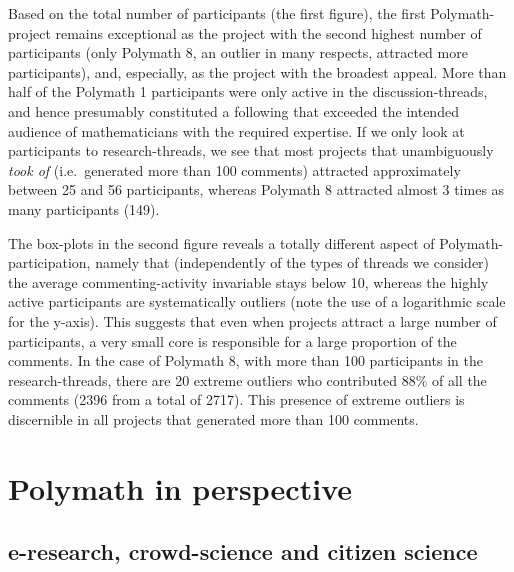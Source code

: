 \documentclass[article, floatfix, groupaddress, prb]{revtex4-1}
\begin{document}
    \begin{figure}
        \begin{center}\end{center}
        \caption{}
        \label{}
    \end{figure}
    
    Based on the total number of participants (the first figure), the first
Polymath-project remains exceptional as the project with the second
highest number of participants (only Polymath 8, an outlier in many
respects, attracted more participants), and, especially, as the project
with the broadest appeal. More than half of the Polymath 1 participants
were only active in the discussion-threads, and hence presumably
constituted a following that exceeded the intended audience of
mathematicians with the required expertise. If we only look at
participants to research-threads, we see that most projects that
unambiguously \emph{took of} (i.e.~generated more than 100 comments)
attracted approximately between 25 and 56 participants, whereas Polymath
8 attracted almost 3 times as many participants (149).

The box-plots in the second figure reveals a totally different aspect of
Polymath-participation, namely that (independently of the types of
threads we consider) the average commenting-activity invariable stays
below 10, whereas the highly active participants are systematically
outliers (note the use of a logarithmic scale for the y-axis). This
suggests that even when projects attract a large number of participants,
a very small core is responsible for a large proportion of the comments.
In the case of Polymath 8, with more than 100 participants in the
research-threads, there are 20 extreme outliers who contributed 88\% of
all the comments (2396 from a total of 2717). This presence of extreme
outliers is discernible in all projects that generated more than 100
comments.

    \section{Polymath in perspective}\label{polymath-in-perspective}

\subsection{e-research, crowd-science and citizen
science}\label{e-research-crowd-science-and-citizen-science}
\end{document}

